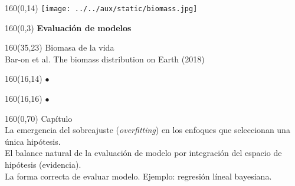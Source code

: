 \documentclass[shownotes,aspectratio=169]{beamer}
\newcounter{capitulo}
\newcommand{\unidad}{\thecapitulo \stepcounter{capitulo}}
\begin{document}
\begin{frame}
\begin{textblock}{160}(0,14) \centering
\texttt{[image: ../../aux/static/biomass.jpg]}
\end{textblock}

\begin{textblock}{160}(0,3) \centering
\LARGE \textcolor{black!90}{\fontsize{22}{0}\selectfont \textbf{Evaluación de modelos}}
\end{textblock}

\begin{textblock}{160}(35,23)
\textcolor{black!95}{\small Biomasa de la vida \\
\fontsize{2}{0}\selectfont \hspace{0.05cm} Bar-on et al. The biomass distribution on Earth (2018) \\}
\end{textblock}

\begin{textblock}{160}(16,14)
\LARGE \textcolor{black!0}{\fontsize{1200}{1200}\selectfont $\bm{\bullet}$ }
\end{textblock}
\begin{textblock}{160}(16,16)
\LARGE \textcolor{black!0}{\fontsize{1200}{1200}\selectfont $\bm{\bullet}$ }
\end{textblock}


\begin{textblock}{160}(0,70) \centering
\textcolor{black!95}{Capítulo \unidad \\ \small
La emergencia del sobreajuste (\emph{overfitting}) en los enfoques que seleccionan una única hipótesis. \\
El balance natural de la evaluación de modelo por integración del espacio de hipótesis (evidencia). \\
La forma correcta de evaluar modelo. Ejemplo: regresión líneal bayesiana.\\
}
\end{textblock}


\end{frame}
\end{document}
